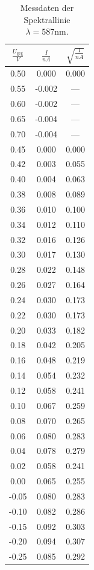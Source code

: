 \begin{table} [H]
	\centering
	\caption{Messdaten der Spektrallinie $\lambda = 587 \text{nm}$.}
	\label{tab:gelb}
	\begin{tabular}{c|c|c}
		\toprule
		{$\frac{U_\text{geg}}{V}$}&{$\frac{I}{nA}$}&{$\sqrt{\frac{I}{nA}}$} \\
		\midrule
		0.50 &0.000&0.000\\
		0.55 &-0.002&---\\
		0.60 &-0.002&---\\
		0.65 &-0.004&---\\
		0.70 &-0.004&---\\
		0.45 &0.000&0.000\\
		0.42 &0.003&0.055\\
		0.40 &0.004&0.063\\
		0.38 &0.008&0.089\\
		0.36 &0.010&0.100\\
		0.34 &0.012&0.110\\
		0.32 &0.016&0.126\\
		0.30 &0.017&0.130\\
		0.28 &0.022&0.148\\
		0.26 &0.027&0.164\\
		0.24 &0.030&0.173\\
		0.22 &0.030&0.173\\
		0.20 &0.033&0.182\\
		0.18 &0.042&0.205\\
		0.16 &0.048&0.219\\
		0.14 &0.054&0.232\\
		0.12 &0.058&0.241\\
		0.10 &0.067&0.259\\
		0.08 &0.070&0.265\\
		0.06 &0.080&0.283\\
		0.04 &0.078&0.279\\
		0.02 &0.058&0.241\\
		0.00 &0.065&0.255\\
		-0.05 &0.080&0.283\\
		-0.10 &0.082&0.286\\
		-0.15 &0.092&0.303\\
		-0.20 &0.094&0.307\\
		-0.25 &0.085&0.292\\
		\bottomrule 
	\end{tabular}
\end{table} 

